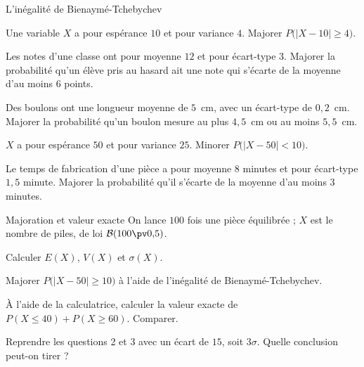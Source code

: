 \begin{exercice}[2]{L'inégalité de Bienaymé-Tchebychev}
\begin{questions}
  \item Une variable $X$ a pour espérance $10$ et pour variance $4$. Majorer $P\big(|X-10|\geq4\big)$.
  \item Les notes d'une classe ont pour moyenne $12$ et pour écart-type $3$. Majorer la probabilité qu'un élève pris au hasard ait
    une note qui s'écarte de la moyenne d'au moins $6$ points.
  \item Des boulons ont une longueur moyenne de $5$~cm, avec un écart-type de $0{,}2$~cm. Majorer la probabilité qu'un boulon mesure
    au plus $4{,}5$~cm ou au moins $5{,}5$~cm.
  \item $X$ a pour espérance $50$ et pour variance $25$. Minorer $P\big(|X-50|<10\big)$.
  \item Le temps de fabrication d'une pièce a pour moyenne $8$ minutes et pour écart-type $1{,}5$ minute. Majorer la probabilité qu'il
    s'écarte de la moyenne d'au moins $3$ minutes.
\end{questions}
\end{exercice}

\begin{exercice}[2]{Majoration et valeur exacte}
On lance $100$ fois une pièce équilibrée ; $X$ est le nombre de piles, de loi $\mathcal{B}(100\pv0{,}5)$.
\begin{questions}
  \item Calculer $E(X)$, $V(X)$ et $\sigma(X)$.
  \item Majorer $P\big(|X-50|\geq10\big)$ à l'aide de l'inégalité de Bienaymé-Tchebychev.
  \item À l'aide de la calculatrice, calculer la valeur exacte de $P(X\leq40)+P(X\geq60)$. Comparer.
  \item Reprendre les questions 2 et 3 avec un écart de $15$, soit $3\sigma$. Quelle conclusion peut-on tirer ?
\end{questions}
\end{exercice}


